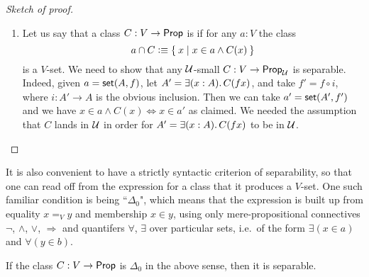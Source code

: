 \begin{proof}[Sketch of proof]
\begin{enumerate}
\item Let us say that a class $C: V\to\mathsf{Prop}$ is  if for any $a:V$ the class
  \begin{equation*}
    a \cap C \vcentcolon\equiv\Set{x | x\in a \wedge C(x)}
  \end{equation*}
  is a $V$-set.
We need to show that any $\mathcal{U}$-small  $C: V \to \mathsf{Prop}_\mathcal{U}$ is separable. Indeed, given $a=\mathsf{set}(A,f)$, let $A' = \exis{x:A}C(fx)$, and take $f' = f\circ i$, where $i : A' \to A$ is the obvious inclusion.  Then we can take $a' = \mathsf{set}(A',f')$ and we have $x\in a\wedge C(x) \Leftrightarrow x\in a'$ as claimed.  We needed the assumption that $C$ lands in $\mathcal{U}$ in order for $A' = \exis{x:A}C(fx)$ to be in $\mathcal{U}$.\qedhere
\end{enumerate}
\end{proof}

It is also convenient to have a strictly syntactic criterion of separability, so that one can read off from the expression for a class that it produces a $V$-set.  One such familiar condition is being ``$\Delta_0$", which means that the expression is built up from equality $x=_V y$ and membership $x\in y$, using only mere-propositional connectives $\neg$, $\land$, $\lor$, $\Rightarrow$ and quantifers $\forall$, $\exists$ over particular sets, i.e.\ of the form $\exists(x\in a)$ and $\forall(y\in b)$.  

\begin{cor}\label{cor:Delta0sep}
If the class $C: V \to \mathsf{Prop}$ is $\Delta_0$ in the above sense, then it is separable.
\end{cor}

